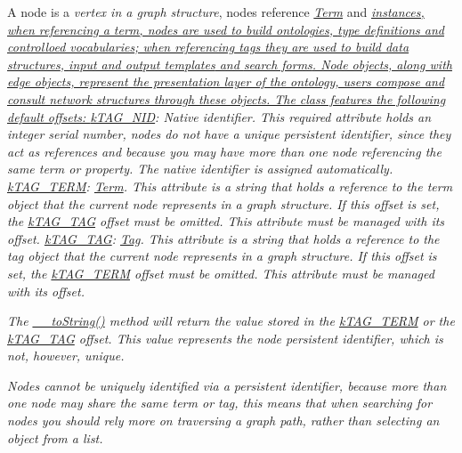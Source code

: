 A node is a {\itshape vertex in a graph structure}, nodes reference {\itshape \hyperlink{class_ontology_wrapper_1_1_term}{Term}} and {\itshape \hyperlink{class_ontology_wrapper_1_1_tag}{instances, when referencing a term, nodes are used to build {\itshape ontologies}, {\itshape type definitions} and {\itshape controlloed vocabularies}; when referencing tags they are used to build {\itshape data structures}, {\itshape input and output templates} and {\itshape search forms}. Node objects, along with edge objects, represent the presentation layer of the ontology, users compose and consult network structures through these objects. The class features the following default offsets\-: } {\ttfamily \hyperlink{}{k\-T\-A\-G\-\_\-\-N\-I\-D}}\-: {\itshape Native identifier}. This required attribute holds an {\itshape integer serial number}, nodes do not have a unique persistent identifier, since they act as references and because you may have more than one node referencing the same term or property. The native identifier is assigned automatically. {\ttfamily \hyperlink{}{k\-T\-A\-G\-\_\-\-T\-E\-R\-M}}\-: {\itshape \hyperlink{class_ontology_wrapper_1_1_term}{Term}}. This attribute is a {\itshape string} that holds a reference to the {\itshape term object} that the current node {\itshape represents in a graph structure}. If this offset is set, the \hyperlink{}{k\-T\-A\-G\-\_\-\-T\-A\-G} offset must be omitted. This attribute must be managed with its offset. {\ttfamily \hyperlink{}{k\-T\-A\-G\-\_\-\-T\-A\-G}}\-: {\itshape \hyperlink{class_ontology_wrapper_1_1_tag}{Tag}}. This attribute is a {\itshape string} that holds a reference to the {\itshape tag object} that the current node {\itshape represents in a graph structure}. If this offset is set, the \hyperlink{}{k\-T\-A\-G\-\_\-\-T\-E\-R\-M} offset must be omitted. This attribute must be managed with its offset. }

{\itshape The \hyperlink{class_ontology_wrapper_1_1_node_a69d608a44e2c93d58f328f235be1f01a}{\-\_\-\-\_\-to\-String()} method will return the value stored in the \hyperlink{}{k\-T\-A\-G\-\_\-\-T\-E\-R\-M} or the \hyperlink{}{k\-T\-A\-G\-\_\-\-T\-A\-G} offset. This value represents the node persistent identifier, which is not, however, unique.}

{\itshape Nodes cannot be uniquely identified via a persistent identifier, because more than one node may share the same term or tag, this means that when searching for nodes you should rely more on traversing a graph path, rather than selecting an object from a list.}

